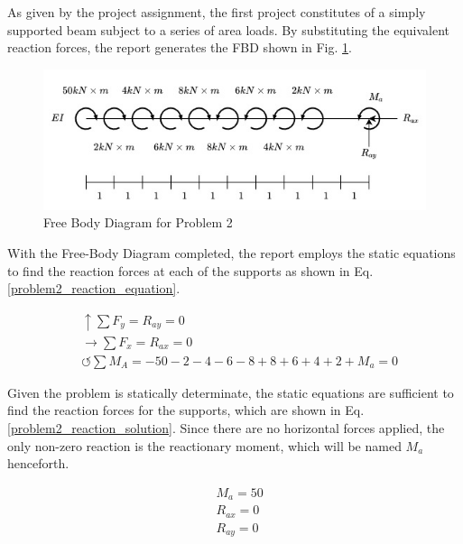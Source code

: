 \documentclass[a4paper]{article}
\begin{document}
As given by the project assignment, the first project constitutes of a simply supported beam subject to a series of area loads. By substituting the equivalent reaction forces, the report generates the FBD shown in Fig. \ref{FBD_2}.

\begin{figure}[h]
\includegraphics[width=\textwidth]{FBD/FBD_2.jpg}
\caption{Free Body Diagram for Problem 2}
\label{FBD_2}
\end{figure}

With the Free-Body Diagram completed, the report employs the static equations to find the reaction forces at each of the supports as shown in Eq. \ref{problem2_reaction_equation}.

\begin{equation}
\begin{split}
	&\uparrow \sum F_y = R_{ay} = 0 \\
 	&\rightarrow \sum F_x = R_{ax} = 0 \\
 	&\circlearrowleft \sum M_A = -50 - 2 - 4 - 6 - 8 + 8 + 6 + 4 + 2 + M_a = 0
\end{split}
\label{problem2_reaction_equation}
\end{equation}

Given the problem is statically determinate, the static equations are sufficient to find the reaction forces for the supports, which are shown in Eq. \ref{problem2_reaction_solution}. Since there are no horizontal forces applied, the only non-zero reaction is the reactionary moment, which will be named $M_a$ henceforth.

\begin{equation}
\begin{split}
	& M_a = 50 \\
	& R_{ax} = 0 \\
	& R_{ay} = 0 \\
\end{split}
\label{problem2_reaction_solution}
\end{equation}
\end{document}
